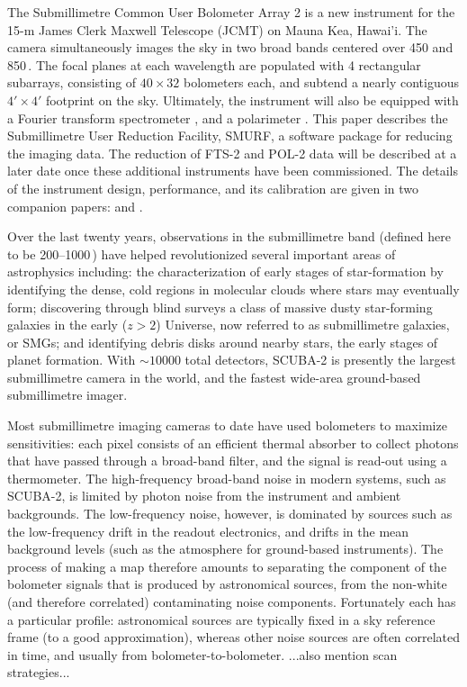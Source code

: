 \documentclass[useAMS,usenatbib,nofootinbib]{mn2e}
\newcommand{\scuba}{SCUBA-2}
\begin{document}
The Submillimetre Common User Bolometer Array 2
\citep[\scuba,][]{holland2006} is a new instrument for the 15-m James
Clerk Maxwell Telescope (JCMT) on Mauna Kea, Hawai'i. The camera
simultaneously images the sky in two broad bands centered over 450 and
850\,\micron. The focal planes at each wavelength are populated with 4
rectangular subarrays, consisting of $40 \times 32$ bolometers each,
and subtend a nearly contiguous $4' \times 4'$ footprint on the sky.
Ultimately, the instrument will also be equipped with a Fourier
transform spectrometer \citep[FTS-2,][]{gom2010}, and a polarimeter
\cite[POL-2,][]{bastien2005}. This paper describes the Submillimetre
User Reduction Facility, SMURF, a software package for reducing the
imaging data. The reduction of FTS-2 and POL-2 data will be described
at a later date once these additional instruments have been
commissioned. The details of the instrument design, performance, and
its calibration are given in two companion papers: \citet{holland2011}
and \citet{dempsey2011}.

Over the last twenty years, observations in the submillimetre band
(defined here to be 200--1000\,\micron) have helped revolutionized
several important areas of astrophysics including: the
characterization of early stages of star-formation by identifying the
dense, cold regions in molecular clouds where stars may eventually
form; discovering through blind surveys a class of massive dusty
star-forming galaxies in the early ($z>2$) Universe, now referred to
as submillimetre galaxies, or SMGs; and identifying debris disks
around nearby stars, the early stages of planet formation.  With
$\sim10000$ total detectors, SCUBA-2 is presently the largest
submillimetre camera in the world, and the fastest wide-area
ground-based submillimetre imager.

Most submillimetre imaging cameras to date have used bolometers to
maximize sensitivities: each pixel consists of an efficient thermal
absorber to collect photons that have passed through a broad-band
filter, and the signal is read-out using a thermometer. The
high-frequency broad-band noise in modern systems, such as SCUBA-2, is
limited by photon noise from the instrument and ambient
backgrounds. The low-frequency noise, however, is dominated by sources
such as the low-frequency drift in the readout electronics, and drifts
in the mean background levels (such as the atmosphere for ground-based
instruments). The process of making a map therefore amounts to
separating the component of the bolometer signals that is produced by
astronomical sources, from the non-white (and therefore correlated)
contaminating noise components. Fortunately each has a particular
profile: astronomical sources are typically fixed in a sky reference
frame (to a good approximation), whereas other noise sources are often
correlated in time, and usually from bolometer-to-bolometer. ...also
mention scan strategies...
\end{document}
